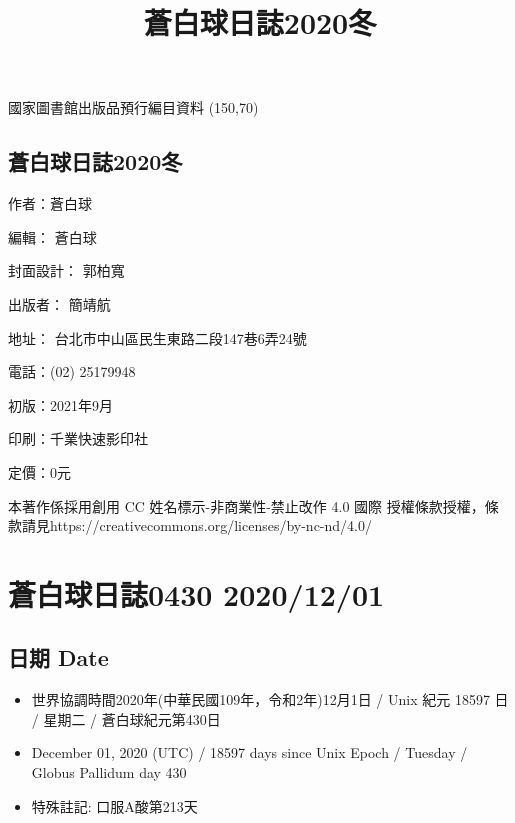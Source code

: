 \documentclass[a5paper, 10pt
]{book}
\title{蒼白球日誌2020冬}
\date{}
\providecommand{\tightlist}{%
  \setlength{\itemsep}{0pt}\setlength{\parskip}{0pt}}
\begin{document}
\clearpage\maketitle
\thispagestyle{empty}
\subsection{}
\begin{flushleft}
國家圖書館出版品預行編目資料 \linebreak
\framebox(150,70){}
\end{flushleft}
\subsection{蒼白球日誌2020冬}
\begin{flushleft}
作者：蒼白球

編輯： 蒼白球

封面設計： 郭柏寬

出版者： 簡靖航

地址： 台北市中山區民生東路二段147巷6弄24號

電話：(02) 25179948

初版：2021年9月

印刷：千業快速影印社

定價：0元

本著作係採用創用 CC 姓名標示-非商業性-禁止改作 4.0 國際 授權條款授權，條款請見\linebreak https://creativecommons.org/licenses/by-nc-nd/4.0/
\end{flushleft}
\clearpage
\tableofcontents

\hypertarget{ux84bcux767dux7403ux65e5ux8a8c0430-20201201}{%
\section{蒼白球日誌0430
2020/12/01}\label{ux84bcux767dux7403ux65e5ux8a8c0430-20201201}}

\hypertarget{ux65e5ux671f-date}{%
\subsection{日期 Date}\label{ux65e5ux671f-date}}

\begin{itemize}
\tightlist
\item
  世界協調時間2020年(中華民國109年，令和2年)12月1日 / Unix 紀元 18597 日
  / 星期二 / 蒼白球紀元第430日
\item
  December 01, 2020 (UTC) / 18597 days since Unix Epoch / Tuesday /
  Globus Pallidum day 430
\item
  特殊註記: 口服A酸第213天
\end{itemize}
\end{document}
